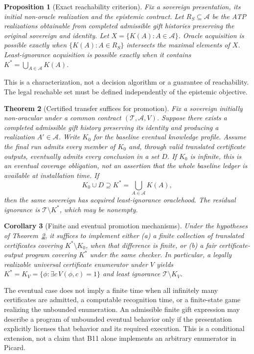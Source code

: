 \documentclass[11pt]{article}
\newtheorem{theorem}{Theorem}[section]
\newtheorem{proposition}[theorem]{Proposition}
\newtheorem{corollary}[theorem]{Corollary}
\theoremstyle{definition}\newtheorem{definition}[theorem]{Definition}
\newcommand{\T}{\mathcal T}\newcommand{\A}{\mathcal A}\newcommand{\id}{\operatorname{ID}}\newcommand{\Con}{\operatorname{Con}}\newcommand{\Oracle}{\operatorname{Oracle}}\newcommand{\Btrade}{\mathrm{B11}}
\begin{document}
\begin{proposition}[Exact reachability criterion]\label{thm:reach}
Fix a sovereign presentation, its initial non-oracle realization and the epistemic contract. Let $R_S\subseteq\A$ be the ATP realizations obtainable from completed admissible gift histories preserving the original sovereign and identity. Let $X=\{K(A):A\in\A\}$. Oracle acquisition is possible exactly when $\{K(A):A\in R_S\}$ intersects the maximal elements of $X$. Least-ignorance acquisition is possible exactly when it contains $K^*=\bigcup_{A\in\A}K(A)$.
\end{proposition}
\noindent This is a characterization, not a decision algorithm or a guarantee of reachability. The legal reachable set must be defined independently of the epistemic objective.
\begin{theorem}[Certified transfer suffices for promotion]\label{thm:transfer}
Fix a sovereign initially non-oracular under a common contract $(\T,\A,V)$. Suppose there exists a completed admissible gift history preserving its identity and producing a realization $A'\in\A$. Write $K_0$ for the baseline eventual knowledge profile. Assume the final run admits every member of $K_0$ and, through valid translated certificate outputs, eventually admits every conclusion in a set $D$. If $K_0$ is infinite, this is an eventual coverage obligation, not an assertion that the whole baseline ledger is available at installation time. If
\[
 K_0\cup D\supseteq K^*=\bigcup_{A\in\A}K(A),
\]
then the same sovereign has acquired least-ignorance oraclehood. The residual ignorance is $\T\setminus K^*$, which may be nonempty.
\end{theorem}
\begin{corollary}[Finite and eventual promotion mechanisms]\label{thm:ceiling}
Under the hypotheses of Theorem~\ref{thm:transfer}, it suffices to implement either (a) a finite collection of translated certificates covering $K^*\setminus K_0$, when that difference is finite, or (b) a fair certificate-output program covering $K^*$ under the same checker. In particular, a legally realizable universal certificate enumerator under $V$ yields $K^*=K_V=\{\phi:\exists c\,V(\phi,c)=1\}$ and least ignorance $\T\setminus K_V$.
\end{corollary}
\noindent The eventual case does not imply a finite time when all infinitely many certificates are admitted, a computable recognition time, or a finite-state game realizing the unbounded enumeration. An admissible finite gift expression may describe a program of unbounded eventual behavior only if the presentation explicitly licenses that behavior and its required execution. This is a conditional extension, not a claim that B11 alone implements an arbitrary enumerator in Picard.
\end{document}
